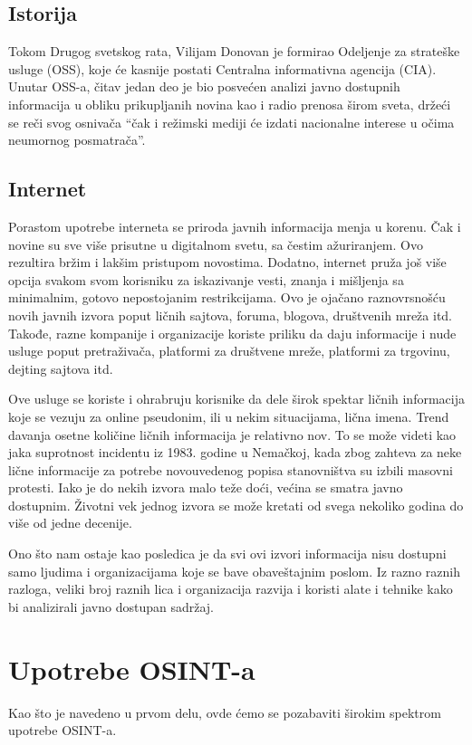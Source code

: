 \documentclass[a4paper, 11pt]{article}
\begin{document}
\subsection{Istorija}
Tokom Drugog svetskog rata, Vilijam Donovan je formirao Odeljenje za strateške usluge (OSS), koje će kasnije postati Centralna informativna agencija (CIA). Unutar OSS-a, čitav jedan deo je bio posvećen analizi javno dostupnih informacija u obliku prikupljanih novina kao i radio prenosa širom sveta, držeći se reči svog osnivača “čak i režimski mediji će izdati nacionalne interese u očima neumornog posmatrača”.
\subsection{Internet}
Porastom upotrebe interneta se priroda javnih informacija menja u korenu. Čak i novine su sve više prisutne u digitalnom svetu, sa čestim ažuriranjem. Ovo rezultira bržim i lakšim pristupom novostima. Dodatno, internet pruža još više opcija svakom svom korisniku za iskazivanje vesti, znanja i mišljenja sa minimalnim, gotovo nepostojanim restrikcijama. Ovo je ojačano raznovrsnošću novih javnih izvora poput ličnih sajtova, foruma, blogova, društvenih mreža itd. Takođe, razne kompanije i organizacije koriste priliku da daju informacije i nude usluge poput pretraživača, platformi za društvene mreže, platformi za trgovinu, dejting sajtova itd.\newline

Ove usluge se koriste i ohrabruju korisnike da dele širok spektar ličnih informacija koje se vezuju za online pseudonim, ili u nekim situacijama, lična imena. Trend davanja osetne količine ličnih informacija je relativno nov.  To se može videti kao jaka suprotnost incidentu iz 1983. godine u Nemačkoj, kada zbog zahteva za neke lične informacije za potrebe novouvedenog popisa stanovništva su izbili masovni protesti.
Iako je do nekih izvora malo teže doći, većina se smatra javno dostupnim. Životni vek jednog izvora se može kretati od svega nekoliko godina do više od jedne decenije.\newline

Ono što nam ostaje kao posledica je da svi ovi izvori informacija nisu dostupni samo ljudima i organizacijama koje se bave obaveštajnim poslom. Iz razno raznih razloga, veliki broj raznih lica i organizacija razvija i koristi alate i tehnike kako bi analizirali javno dostupan sadržaj.
\newpage
\section{Upotrebe OSINT-a}
Kao što je navedeno u prvom delu, ovde ćemo se pozabaviti širokim spektrom upotrebe OSINT-a.\newline
\end{document}
